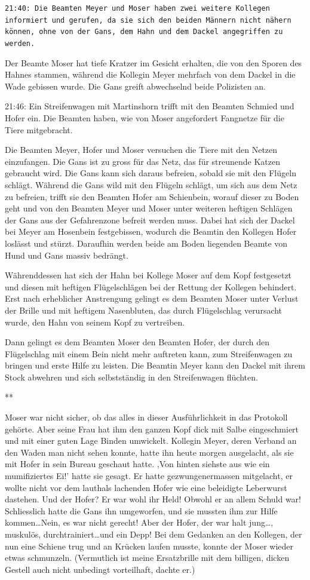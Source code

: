 \documentclass[11pt,titlepage,a5paper]{book}
\newcommand{\sterne}{\par{\centering ***\par}}
\begin{document}
{\tt 21:40: Die Beamten Meyer und Moser haben zwei weitere Kollegen informiert und gerufen, da sie sich den beiden Männern nicht nähern können, ohne von der Gans, dem Hahn und dem Dackel angegriffen zu werden.

Der Beamte Moser hat tiefe Kratzer im Gesicht erhalten, die von den Sporen des Hahnes stammen, während die Kollegin Meyer mehrfach von dem Dackel in die Wade gebissen wurde. Die Gans greift abwechselnd beide Polizisten an.

21:46: Ein Streifenwagen mit Martinshorn trifft mit den Beamten Schmied und Hofer ein. Die Beamten haben, wie von Moser angefordert Fangnetze für die Tiere mitgebracht.

Die Beamten Meyer, Hofer und Moser versuchen die Tiere mit den Netzen einzufangen. Die Gans ist zu gross für das Netz, das für streunende Katzen gebraucht wird. Die Gans kann  sich daraus befreien, sobald sie mit den Flügeln schlägt.
Während die Gans wild mit den Flügeln schlägt, um sich aus dem Netz zu befreien, trifft sie den Beamten Hofer am Schienbein, worauf dieser zu Boden geht und von den Beamten Meyer und Moser unter weiteren heftigen Schlägen der Gans aus der Gefahrenzone befreit werden muss. Dabei hat sich der Dackel bei Meyer am Hosenbein festgebissen, wodurch die Beamtin den Kollegen Hofer loslässt und stürzt. Daraufhin werden beide am Boden liegenden Beamte von Hund und Gans massiv bedrängt.

Währenddessen hat sich der Hahn bei Kollege Moser auf dem Kopf festgesetzt und diesen mit heftigen Flügelschlägen bei der Rettung der Kollegen behindert. Erst nach erheblicher Anstrengung gelingt es dem Beamten Moser unter Verlust der Brille und mit heftigem Nasenbluten, das durch Flügelschlag verursacht wurde, den Hahn von seinem Kopf zu vertreiben.

Dann gelingt es dem Beamten Moser den Beamten Hofer, der durch den Flügelschlag mit einem Bein nicht mehr auftreten kann, zum Streifenwagen zu bringen und erste Hilfe zu leisten. Die Beamtin Meyer kann den Dackel mit ihrem Stock abwehren und sich selbstständig in den Streifenwagen flüchten.}

\sterne

Moser war nicht sicher, ob das alles in dieser Ausführlichkeit in das Protokoll gehörte. Aber seine Frau hat ihm den ganzen Kopf dick mit Salbe eingeschmiert  und mit einer guten Lage Binden umwickelt. Kollegin Meyer, deren Verband an den Waden man nicht sehen konnte, hatte ihn heute morgen ausgelacht, als sie mit Hofer in sein Bureau geschaut hatte. ,Von hinten siehste aus wie ein mumifiziertes Ei!' hatte sie gesagt. Er hatte gezwungenermassen mitgelacht, er wollte nicht vor dem lauthals lachenden Hofer wie eine beleidigte Leberwurst dastehen. Und der Hofer? Er war wohl ihr Held! Obwohl er an allem Schuld war! Schliesslich hatte die Gans ihn umgeworfen, und sie mussten ihm zur Hilfe kommen\dots Nein, es war nicht gerecht! Aber der Hofer, der war halt jung\dots, muskulös, durchtrainiert\dots und ein Depp! Bei dem Gedanken an den Kollegen, der nun eine Schiene trug und an Krücken laufen musste, konnte der Moser wieder etwas schmunzeln. (Vermutlich ist meine Ersatzbrille mit dem billigen, dicken Gestell auch nicht unbedingt vorteilhaft, dachte er.)
\end{document}
